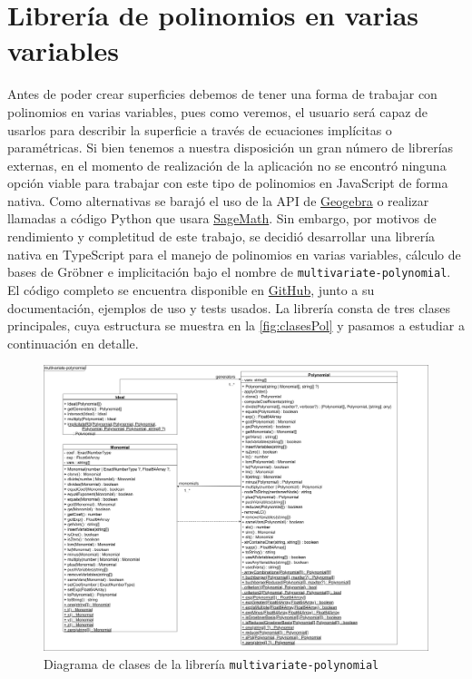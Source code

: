 \section{Librería de polinomios en varias variables}
Antes de poder crear superficies debemos de tener una forma de trabajar con polinomios en varias variables, pues como veremos, el usuario será capaz de usarlos para describir la superficie a través de ecuaciones implícitas o paramétricas.
Si bien tenemos a nuestra disposición un gran número de librerías externas, en el momento de realización de la aplicación no se encontró ninguna opción viable para trabajar con este tipo de polinomios en JavaScript de forma nativa. Como alternativas se barajó el uso de la API de \href{https://wiki.geogebra.org/en/Reference:GeoGebra_Apps_API}{Geogebra} o realizar llamadas a código Python que usara \href{https://www.sagemath.org/}{SageMath}. Sin embargo, por motivos de rendimiento y completitud de este trabajo, se decidió desarrollar una librería nativa en TypeScript para el manejo de polinomios en varias variables, cálculo de bases de Gröbner e implicitación bajo el nombre de \texttt{multivariate-polynomial}. El código completo se encuentra disponible en \href{https://github.com/Daniel2000815/multivariate-polynomial}{GitHub}, junto a su documentación, ejemplos de uso y tests usados. La librería consta de tres clases principales, cuya estructura se muestra en la \autoref{fig:clasesPol} y pasamos a estudiar a continuación en detalle.
\begin{figure}[ht!]
    \centering
    \includegraphics[width=\textwidth]{Plantilla-TFG-master/img/clasesPol.png}
    \caption{Diagrama de clases de la librería \texttt{multivariate-polynomial}}
    \label{fig:clasesPol}
\end{figure}

